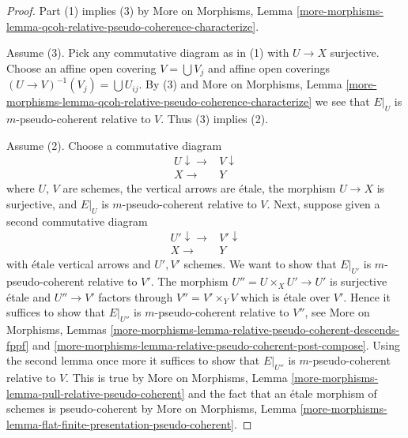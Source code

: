 \begin{proof}
Part (1) implies (3) by More on Morphisms, Lemma
\ref{more-morphisms-lemma-qcoh-relative-pseudo-coherence-characterize}.

\medskip\noindent
Assume (3). Pick any commutative diagram as in (1) with $U \to X$ surjective.
Choose an affine open covering $V = \bigcup V_j$ and affine open coverings
$(U \to V)^{-1}(V_j) = \bigcup U_{ij}$. By (3) and More on Morphisms, Lemma
\ref{more-morphisms-lemma-qcoh-relative-pseudo-coherence-characterize}
we see that $E|_U$ is $m$-pseudo-coherent relative to $V$.
Thus (3) implies (2).

\medskip\noindent
Assume (2). Choose a commutative diagram
$$
\begin{array}{cc}U \downarrow\longrightarrow & V \downarrow \\ X \longrightarrow & Y\end{array}
$$
where $U$, $V$ are schemes, the vertical arrows are \'etale, the
morphism $U \to X$ is surjective, and $E|_U$ is $m$-pseudo-coherent
relative to $V$. Next, suppose given a second commutative diagram
$$
\begin{array}{cc}U' \downarrow\longrightarrow & V' \downarrow \\ X \longrightarrow & Y\end{array}
$$
with \'etale vertical arrows and $U', V'$ schemes. We want to show
that $E|_{U'}$ is $m$-pseudo-coherent relative to $V'$.
The morphism $U'' = U \times_X U' \to U'$ is surjective \'etale
and $U'' \to V'$ factors through $V'' = V' \times_Y V$ which
is \'etale over $V'$. Hence it suffices to show that $E|_{U''}$
is $m$-pseudo-coherent relative to $V''$, see
More on Morphisms, Lemmas
\ref{more-morphisms-lemma-relative-pseudo-coherent-descends-fppf} and
\ref{more-morphisms-lemma-relative-pseudo-coherent-post-compose}.
Using the second lemma once more it suffices to show that
$E|_{U''}$ is $m$-pseudo-coherent relative to $V$.
This is true by More on Morphisms, Lemma
\ref{more-morphisms-lemma-pull-relative-pseudo-coherent}
and the fact that an \'etale morphism of schemes is pseudo-coherent by
More on Morphisms, Lemma
\ref{more-morphisms-lemma-flat-finite-presentation-pseudo-coherent}.
\end{proof}

